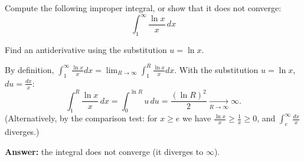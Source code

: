 
\begin{question}
Compute the following improper integral, or show that it does not converge:
\[ \int_1^\infty \frac{\ln x}{x}\,dx \]
\end{question}

\begin{hint}
Find an antiderivative using the substitution $u = \ln x$.
\end{hint}

\begin{solution}
By definition, $\int_1^\infty\frac{\ln x}{x}dx = \lim_{R\to\infty}\int_1^R\frac{\ln x}{x}dx$. With the substitution $u = \ln x$, $du = \frac{dx}{x}$:
\[ \int_1^R\frac{\ln x}{x}\,dx = \int_0^{\ln R}u\,du = \frac{(\ln R)^2}{2} \xrightarrow[R\to\infty]{} \infty. \]
(Alternatively, by the comparison test: for $x \ge e$ we have $\frac{\ln x}{x} \ge \frac1x \ge 0$, and $\int_e^\infty\frac{dx}x$ diverges.)

\textbf{Answer:} the integral does not converge (it diverges to $\infty$).
\end{solution}
